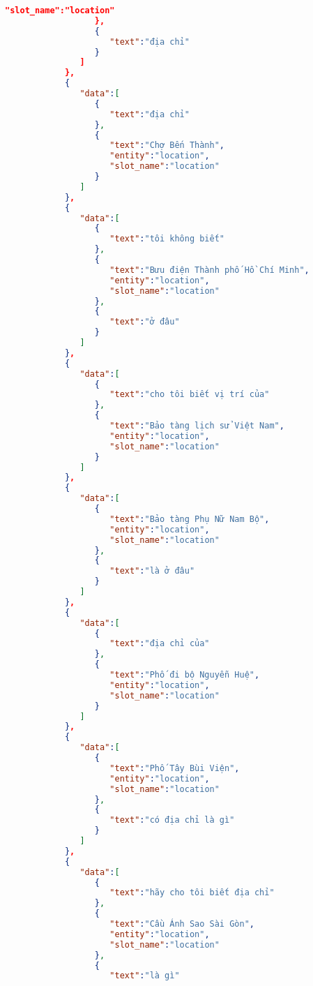 \begin{lstlisting}[language=json,firstnumber=1]
                     "slot_name":"location"
                  },
                  {
                     "text":"địa chỉ"
                  }
               ]
            },
            {
               "data":[
                  {
                     "text":"địa chỉ"
                  },
                  {
                     "text":"Chợ Bến Thành",
                     "entity":"location",
                     "slot_name":"location"
                  }
               ]
            },
            {
               "data":[
                  {
                     "text":"tôi không biết"
                  },
                  {
                     "text":"Bưu điện Thành phố Hồ Chí Minh",
                     "entity":"location",
                     "slot_name":"location"
                  },
                  {
                     "text":"ở đâu"
                  }
               ]
            },
            {
               "data":[
                  {
                     "text":"cho tôi biết vị trí của"
                  },
                  {
                     "text":"Bảo tàng lịch sử Việt Nam",
                     "entity":"location",
                     "slot_name":"location"
                  }
               ]
            },
            {
               "data":[
                  {
                     "text":"Bảo tàng Phụ Nữ Nam Bộ",
                     "entity":"location",
                     "slot_name":"location"
                  },
                  {
                     "text":"là ở đâu"
                  }
               ]
            },
            {
               "data":[
                  {
                     "text":"địa chỉ của"
                  },
                  {
                     "text":"Phố đi bộ Nguyễn Huệ",
                     "entity":"location",
                     "slot_name":"location"
                  }
               ]
            },
            {
               "data":[
                  {
                     "text":"Phố Tây Bùi Viện",
                     "entity":"location",
                     "slot_name":"location"
                  },
                  {
                     "text":"có địa chỉ là gì"
                  }
               ]
            },
            {
               "data":[
                  {
                     "text":"hãy cho tôi biết địa chỉ"
                  },
                  {
                     "text":"Cầu Ánh Sao Sài Gòn",
                     "entity":"location",
                     "slot_name":"location"
                  },
                  {
                     "text":"là gì"

\end{lstlisting}

